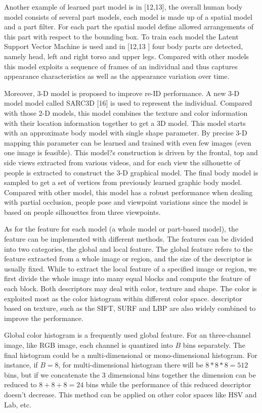 \documentclass[conference,compsoc]{IEEEtran}
\begin{document}
Another example of learned part model is in [12,13], the overall human body model consists of several part models, each model is made up of a spatial model and a part filter. For each part the spatial model define allowed arrangements of this part with respect to the bounding box. To train each model the Latent Support Vector Machine is used and in [12,13 ] four body parts are detected, namely head, left and right torso and upper legs. Compared with other models this model exploits a sequence of frames of an individual and thus captures appearance characteristics as well as the appearance variation over time.

Moreover, 3-D model is proposed to improve re-ID performance. A new 3-D model model called SARC3D [16] is used to represent the individual. Compared with those 2-D models, this model combines the texture and color information with their location information together to get a 3D model. This model starts with an approximate body model with single shape parameter. By precise 3-D mapping this parameter can be learned and trained with even few images (even one image is feasible). This model?s construction is driven by the frontal, top and side views extracted from various videos, and for each view the silhouette of people is extracted to construct the 3-D graphical model. The final body model is sampled to get a set of vertices from previously learned graphic body model. Compared with other model, this model has a robust performance when dealing with partial occlusion, people pose and viewpoint variations since the model is based on people silhouettes from three viewpoints.

As for the feature for each model (a whole model or part-based model), the feature can be implemented with different methods. The features can be divided into two categories, the global and local feature. The global feature refers to the feature extracted from a whole image or region, and the size of the descriptor is usually fixed. While to extract the local feature of a specified image or region, we first divide the whole image into many equal blocks and compute the feature of each block.  Both descriptors may deal with color, texture and shape. The color is exploited most as the color histogram within different color space. descriptor based on texture, such as the SIFT, SURF and LBP are also widely combined to improve the performance.

Global color histogram is a frequently used global feature. For an three-channel image, like RGB image, each channel is quantized into $B$ bins separately. The final histogram could be a multi-dimensional or mono-dimensional histogram. For instance, if $B=8$, for multi-dimensional histogram there will be $8*8*8=512$ bins, but if we concatenate the 3 dimensional bins together the dimension can be reduced to $8+8+8=24$ bins while the performance of this reduced descriptor doesn't decrease. This method can be applied on other color spaces like HSV and Lab, etc.
\end{document}
